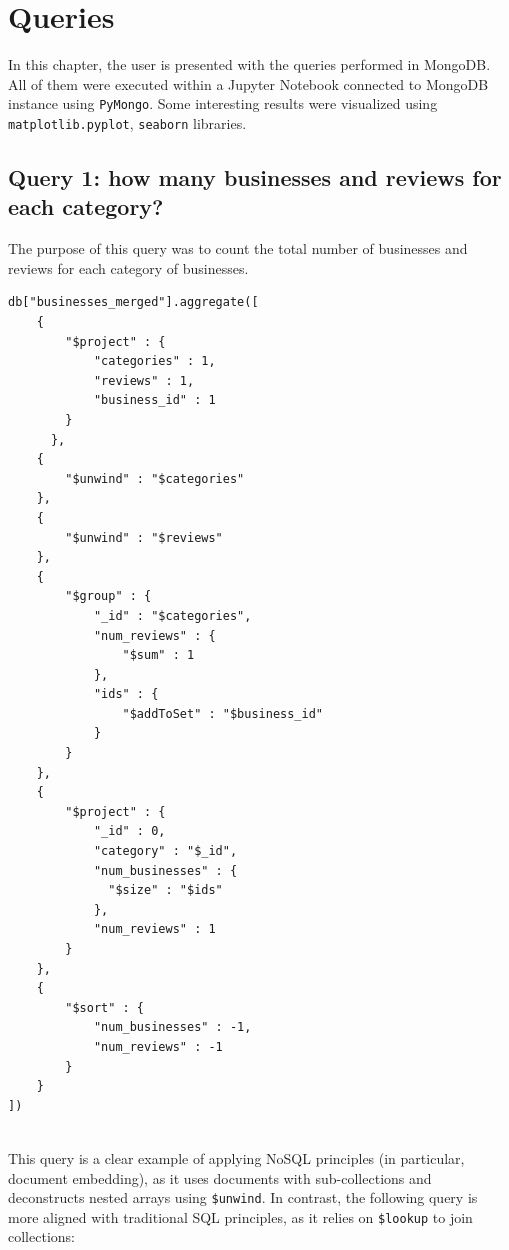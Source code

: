 \documentclass{Configuration_Files/PoliMi3i_thesis}
\begin{document}
\cleardoublepage

\chapter{Queries}
In this chapter, the user is presented with the queries performed in MongoDB. All of them were executed within a Jupyter Notebook connected to MongoDB instance using \texttt{PyMongo}. Some interesting results were visualized using \texttt{matplotlib.pyplot}, \texttt{seaborn} libraries.

\section{Query 1: how many businesses and reviews for each category?}

The purpose of this query was to count the total number of businesses and reviews for each category of businesses.

\bigskip
    
\begin{lstlisting}[style=mongodb]
db["businesses_merged"].aggregate([
    {
        "$project" : {
            "categories" : 1,
            "reviews" : 1,
            "business_id" : 1
        }
      },
    {
        "$unwind" : "$categories"
    },
    {
        "$unwind" : "$reviews"
    },
    {
        "$group" : {
            "_id" : "$categories",
            "num_reviews" : {
                "$sum" : 1
            },
            "ids" : {
                "$addToSet" : "$business_id"
            }
        }
    },
    {
        "$project" : {
            "_id" : 0,
            "category" : "$_id",
            "num_businesses" : {
              "$size" : "$ids"
            },
            "num_reviews" : 1
        }
    },
    {
        "$sort" : {
            "num_businesses" : -1,
            "num_reviews" : -1
        }
    }
])
 
\end{lstlisting}

\bigskip

This query is a clear example of applying NoSQL principles (in particular, document embedding), as it uses documents with sub-collections and deconstructs nested arrays using \texttt{\$unwind}. In contrast, the following query is more aligned with traditional SQL principles, as it relies on \texttt{\$lookup} to join collections:

\bigskip
    
\end{document}
